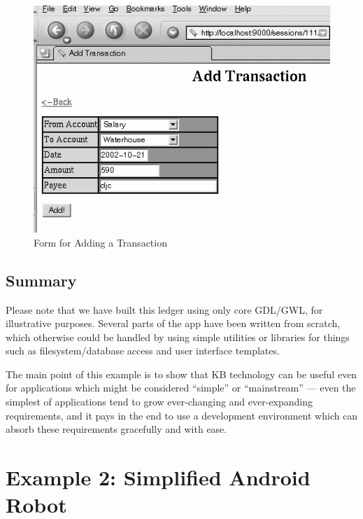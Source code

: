 \documentclass [11pt]{book}
\begin{document}
\begin{figure}
\begin{center}
\includegraphics{../images/add-transaction.png}
\end{center}

\caption{Form for Adding a Transaction}

\label{fig:add-transaction}

\end{figure}


\section{Summary}

\label{sec:summary}


Please note that we have built this ledger using only core GDL/GWL,
for illustrative purposes. Several parts of the app have been written
from scratch, which otherwise could be handled by using simple
utilities or libraries for things such as filesystem/database access
and user interface templates.

The main point of this example is to show that KB technology can be
useful even for applications which might be considered ``simple'' or
``mainstream'' --- even the simplest of applications tend to grow
ever-changing and ever-expanding requirements, and it pays in the 
end to use a development environment which can absorb these
requirements gracefully and with ease.

\chapter{Example 2: Simplified Android Robot}
\end{document}

